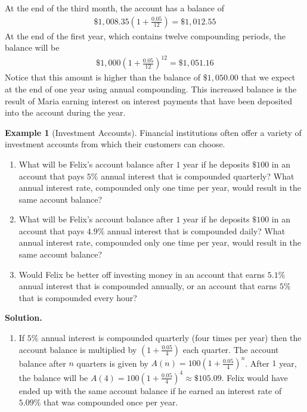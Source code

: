 \documentclass[10pt,]{book}
\theoremstyle{plain}
\theoremstyle{definition}
\theoremstyle{definition}
\newtheorem{example}[theorem]{Example}
\theoremstyle{definition}
\numberwithin{equation}{section}
\begin{document}
At the end of the third month, the account has a balance of%
%
\begin{gather*}
\$1,008.35 (1 + \frac{0.05}{12}) = \$1,012.55
\end{gather*}
At the end of the first year, which contains twelve compounding periods, the balance will be%
%
\begin{gather*}
\$1,000 (1 + \frac{0.05}{12})^{12} = \$1,051.16
\end{gather*}
Notice that this amount is higher than the balance of \(\$1,050.00\) that we expect at the end of one year using annual compounding. This increased balance is the result of Maria earning interest on interest payments that have been deposited into the account during the year.%
\begin{example}[Investment Accounts]\label{chapter04-section05-investment-accounts}
Financial institutions often offer a variety of investment accounts from which their customers can choose.%
\leavevmode%
\begin{enumerate}
\item\hypertarget{li-98}{}What will be Felix’s account balance after \(1\) year if he deposits \(\$100\) in an account that pays \(5\%\) annual interest that is compounded quarterly? What annual interest rate, compounded only one time per year, would result in the same account balance?%
\item\hypertarget{li-99}{}What will be Felix’s account balance after \(1\) year if he deposits \(\$100\) in an account that pays \(4.9\%\) annual interest that is compounded daily? What annual interest rate, compounded only one time per year, would result in the same account balance?%
\item\hypertarget{li-100}{}Would Felix be better off investing money in an account that earns \(5.1\%\) annual interest that is compounded annually, or an account that earns \(5\%\) that is compounded every hour?%
\end{enumerate}
\par\medskip\noindent%
\textbf{Solution.}\quad \leavevmode%
\begin{enumerate}
\item\hypertarget{li-101}{}If \(5\%\) annual interest is compounded quarterly (four times per year) then the account balance is multiplied by \((1+\frac{0.05}{4})\) each quarter. The account balance after \(n\) quarters is given by \(A(n)=100(1+\frac{0.05}{4})^n\). After \(1\) year, the balance will be \(A(4)=100(1+\frac{0.05}{4})^4 \approx \$105.09\). Felix would have ended up with the same account balance if he earned an interest rate of \(5.09\%\) that was compounded once per year.%

\end{enumerate}
\end{example}
\end{document}
